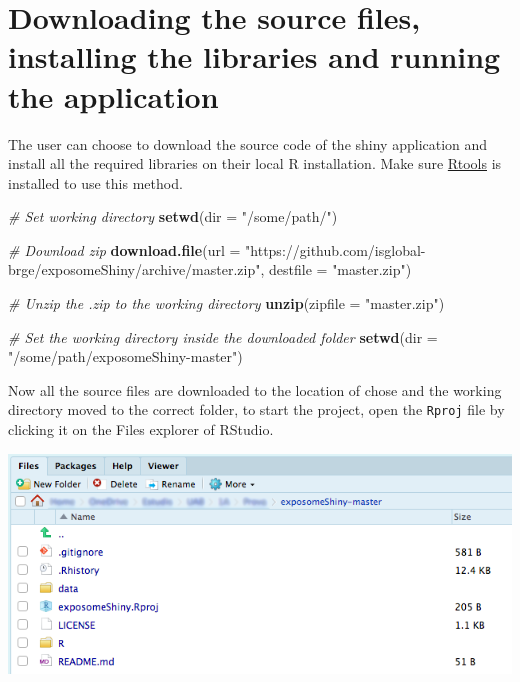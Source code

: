 \documentclass[
]{book}
\newenvironment{Shaded}{\begin{snugshade}}{\end{snugshade}}
\newcommand{\CommentTok}[1]{\textcolor[rgb]{0.56,0.35,0.01}{\textit{#1}}}
\newcommand{\DataTypeTok}[1]{\textcolor[rgb]{0.13,0.29,0.53}{#1}}
\newcommand{\KeywordTok}[1]{\textcolor[rgb]{0.13,0.29,0.53}{\textbf{#1}}}
\newcommand{\NormalTok}[1]{#1}
\newcommand{\StringTok}[1]{\textcolor[rgb]{0.31,0.60,0.02}{#1}}
\begin{document}
\hypertarget{downloading-the-source-files-installing-the-libraries-and-running-the-application}{%
\section{Downloading the source files, installing the libraries and running the application}\label{downloading-the-source-files-installing-the-libraries-and-running-the-application}}

The user can choose to download the source code of the shiny application and install all the required libraries on their local R installation. Make sure \href{https://cran.r-project.org/bin/windows/Rtools/history.html}{Rtools} is installed to use this method.

\begin{Shaded}
\begin{Highlighting}[]
  \CommentTok{# Set working directory}
\KeywordTok{setwd}\NormalTok{(}\DataTypeTok{dir =} \StringTok{"/some/path/"}\NormalTok{)}
      
  \CommentTok{# Download zip}
\KeywordTok{download.file}\NormalTok{(}\DataTypeTok{url =} \StringTok{"https://github.com/isglobal-brge/exposomeShiny/archive/master.zip"}\NormalTok{, }\DataTypeTok{destfile =} \StringTok{"master.zip"}\NormalTok{)}

  \CommentTok{# Unzip the .zip to the working directory}
\KeywordTok{unzip}\NormalTok{(}\DataTypeTok{zipfile =} \StringTok{"master.zip"}\NormalTok{)}

  \CommentTok{# Set the working directory inside the downloaded folder}
\KeywordTok{setwd}\NormalTok{(}\DataTypeTok{dir =} \StringTok{"/some/path/exposomeShiny-master"}\NormalTok{)}
\end{Highlighting}
\end{Shaded}

Now all the source files are downloaded to the location of chose and the working directory moved to the correct folder, to start the project, open the \texttt{Rproj} file by clicking it on the Files explorer of RStudio.

\includegraphics{images/setup1.png}
\end{document}

